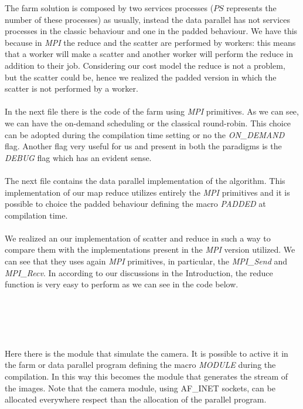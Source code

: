 The farm solution is composed by two services processes ($PS$ represents the number of these processes) as usually, instead the data parallel has not services processes in the classic behaviour and one in the padded behaviour. We have this because in \textit{MPI} the reduce and the scatter are performed by workers: this means that a worker will make a scatter and another worker will perform the reduce in addition to their job. Considering our cost model the reduce is not a problem, but the scatter could be, hence we realized the padded version in which the scatter is not performed by a worker.
\ \\

\ \\
In the next file there is the code of the farm using \textit{MPI} primitives. As we can see, we can have the on-demand scheduling or the classical round-robin. This choice can be adopted during the compilation time setting or no the \textit{ON\_DEMAND} flag. Another flag very useful for us and present in both the paradigms is the \textit{DEBUG} flag which has an evident sense.
\ \\

\ \\
The next file contains the data parallel implementation of the algorithm. This implementation of our map reduce utilizes entirely the \textit{MPI} primitives and it is possible to choice the padded behaviour defining the macro \textit{PADDED} at compilation time.
\ \\

\ \\
We realized an our implementation of scatter and reduce in such a way to compare them with the implementations present in the \textit{MPI} version utilized. We can see that they uses again \textit{MPI} primitives, in particular, the \textit{MPI\_Send} and \textit{MPI\_Recv}. In according to our discussions in the Introduction, the reduce function is very easy to perform as we can see in the code below.
\ \\

\ \\
\ \\

\ \\
\ \\

\ \\
Here there is the module that simulate the camera. It is possible to active it in the farm or data parallel program defining the macro \textit{MODULE} during the compilation. In this way this becomes the module that generates the stream of the images. Note that the camera module, using AF\_INET sockets, can be allocated everywhere respect than the allocation of the parallel program.
